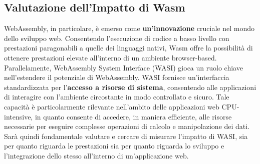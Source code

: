\subsection{Valutazione dell'Impatto di Wasm}
WebAssembly, in particolare, è emerso come \textbf{un'innovazione} cruciale nel mondo dello sviluppo web.
Consentendo l'esecuzione di codice a basso livello con prestazioni paragonabili a quelle dei linguaggi nativi, Wasm offre la possibilità di ottenere prestazioni elevate all'interno di un ambiente browser-based.
\\Parallelamente, WebAssembly System Interface (WASI) gioca un ruolo chiave nell'estendere il potenziale di WebAssembly. WASI fornisce un'interfaccia standardizzata per l'\textbf{accesso a risorse di sistema}, consentendo alle applicazioni di interagire con l'ambiente circostante in modo controllato e sicuro. Tale capacità è particolarmente rilevante nell'ambito delle applicazioni web CPU-intensive, in quanto consente di accedere, in maniera efficiente, alle risorse necessarie per eseguire complesse operazioni di calcolo e manipolazione dei dati.
\\Sarà quindi fondamentale valutare e cercare di misurare l'impatto di WASI, sia per quanto riguarda le prestazioni sia per quanto riguarda lo sviluppo e l'integrazione dello stesso all'interno di un'applicazione web.


